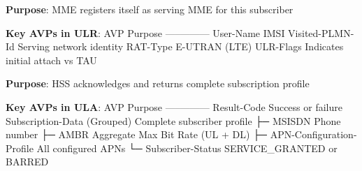 
\textbf{Purpose}: MME registers itself as serving MME for this subscriber

\textbf{Key AVPs in ULR}:\CNbr{}\textbar{} AVP \textbar{} Purpose \textbar{}\CNbr{}\textbar{}—–\textbar{}———\textbar{}\CNbr{}\textbar{} User-Name \textbar{} IMSI \textbar{}\CNbr{}\textbar{} Visited-PLMN-Id \textbar{} Serving network identity \textbar{}\CNbr{}\textbar{} RAT-Type \textbar{} E-UTRAN (LTE) \textbar{}\CNbr{}\textbar{} ULR-Flags \textbar{} Indicates initial attach vs TAU \textbar{}


\textbf{Purpose}: HSS acknowledges and returns complete subscription profile

\textbf{Key AVPs in ULA}:\CNbr{}\textbar{} AVP \textbar{} Purpose \textbar{}\CNbr{}\textbar{}—–\textbar{}———\textbar{}\CNbr{}\textbar{} Result-Code \textbar{} Success or failure \textbar{}\CNbr{}\textbar{} Subscription-Data (Grouped) \textbar{} Complete subscriber profile \textbar{}\CNbr{}\textbar{} ├─ MSISDN \textbar{} Phone number \textbar{}\CNbr{}\textbar{} ├─ AMBR \textbar{} Aggregate Max Bit Rate (UL + DL) \textbar{}\CNbr{}\textbar{} ├─ APN-Configuration-Profile \textbar{} All configured APNs \textbar{}\CNbr{}\textbar{} └─ Subscriber-Status \textbar{} SERVICE\_\allowbreak{}GRANTED or BARRED \textbar{}








\CNchained{}

